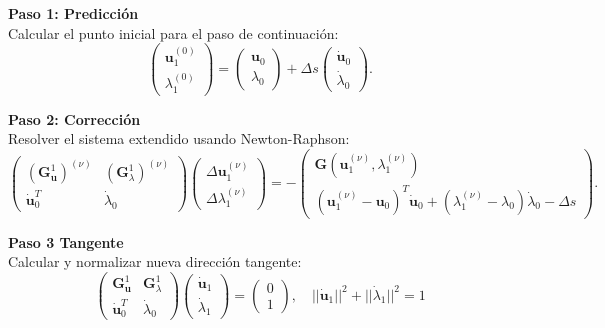 \begin{algorithm}[H]
    \caption{Continuación por Pseudo-Longitud de Arco (PALC)}

    \textbf{Paso 1: Predicción} \\
    Calcular el punto inicial para el paso de continuación:
    \[
        \begin{pmatrix} \mathbf{u}_1^{(0)} \\ \lambda_1^{(0)} \end{pmatrix} =
        \begin{pmatrix} \mathbf{u}_0 \\ \lambda_0 \end{pmatrix}
        + \Delta s
        \begin{pmatrix} \dot{\mathbf{u}}_0 \\ \dot{\lambda}_0 \end{pmatrix}.
    \]

    \textbf{Paso 2: Corrección} \\
    Resolver el sistema extendido usando Newton-Raphson:
    \[
        \begin{pmatrix}
            \left(\mathbf{G}_{\mathbf{u}}^1\right)^{(\nu)} & \left(\mathbf{G}_{\lambda}^1\right)^{(\nu)} \\
            \dot{\mathbf{u}}_0^T                           & \dot{\lambda}_0
        \end{pmatrix}
        \begin{pmatrix}
            \Delta \mathbf{u}_1^{(\nu)} \\[6pt]
            \Delta \lambda_1^{(\nu)}
        \end{pmatrix}
        = -
        \begin{pmatrix}
            \mathbf{G}(\mathbf{u}_1^{(\nu)}, \lambda_1^{(\nu)}) \\[6pt]
            (\mathbf{u}_1^{(\nu)} - \mathbf{u}_0)^T \dot{\mathbf{u}}_0 +
            (\lambda_1^{(\nu)} - \lambda_0) \dot{\lambda}_0
            - \Delta s
        \end{pmatrix}.
    \]

    \textbf{Paso 3 Tangente} \\
    Calcular y normalizar nueva dirección tangente:
    \[
        \begin{pmatrix}
            \mathbf{G}_{\mathbf{u}}^1 & \mathbf{G}_{\lambda}^1 \\
            \dot{\mathbf{u}}_0^T      & \dot{\lambda}_0
        \end{pmatrix}
        \begin{pmatrix}
            \dot{\mathbf{u}}_1 \\ \dot{\lambda}_1
        \end{pmatrix}
        =
        \begin{pmatrix} 0 \\ 1 \end{pmatrix}, \quad
        ||\dot{\mathbf{u}}_1||^2 + ||\dot{\lambda}_1||^2 = 1
    \]


\end{algorithm}
